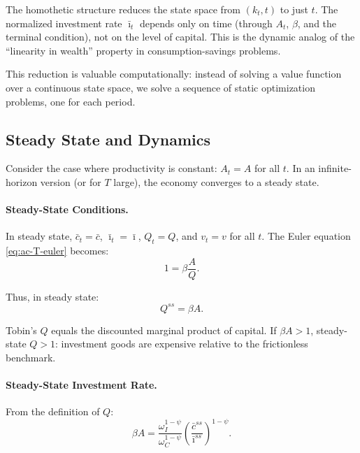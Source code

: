 \begin{calloutnote}
The homothetic structure reduces the state space from $(k_t, t)$ to just $t$. The normalized investment rate $\bar{\imath}_t$ depends only on time (through $A_t$, $\beta$, and the terminal condition), not on the level of capital. This is the dynamic analog of the ``linearity in wealth'' property in consumption-savings problems.

This reduction is valuable computationally: instead of solving a value function over a continuous state space, we solve a sequence of static optimization problems, one for each period.
\end{calloutnote}

\subsection{Steady State and Dynamics}
\label{subsec:ac-T-dynamics}

Consider the case where productivity is constant: $A_t = A$ for all $t$. In an infinite-horizon version (or for $T$ large), the economy converges to a steady state.

\paragraph{Steady-State Conditions.}
In steady state, $\bar{c}_t = \bar{c}$, $\bar{\imath}_t = \bar{\imath}$, $Q_t = Q$, and $v_t = v$ for all $t$. The Euler equation \cref{eq:ac-T-euler} becomes:
\begin{equation}
1 = \beta \frac{A}{Q}.
\label{eq:ac-T-ss-euler}
\end{equation}

Thus, in steady state:
\begin{equation}
Q^{ss} = \beta A.
\label{eq:ac-T-Q-ss}
\end{equation}

Tobin's $Q$ equals the discounted marginal product of capital. If $\beta A > 1$, steady-state $Q > 1$: investment goods are expensive relative to the frictionless benchmark.

\paragraph{Steady-State Investment Rate.}
From the definition of $Q$:
\begin{equation}
\beta A = \frac{\omega_I^{1-\psi}}{\omega_C^{1-\psi}} \left( \frac{\bar{c}^{ss}}{\bar{\imath}^{ss}} \right)^{1-\psi}.
\label{eq:ac-T-Q-ss-def}
\end{equation}

